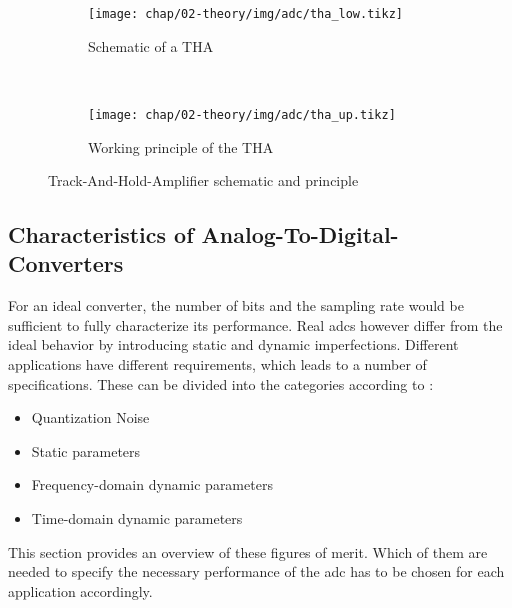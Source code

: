 \begin{figure}[tb]
	\centering
	\begin{subfigure}{\textwidth}
		\centering
		\texttt{[image: chap/02-theory/img/adc/tha\_low.tikz]}  
		\caption{Schematic of a THA}
		\label{fig:tha_low}
	\end{subfigure}
\\[4ex]
	\begin{subfigure}{\textwidth}
		\centering
		\texttt{[image: chap/02-theory/img/adc/tha\_up.tikz]}  
		\caption{Working principle of the THA}
		\label{fig:tha_up}
	\end{subfigure}
	\caption{Track-And-Hold-Amplifier schematic and principle \cite{walt}}
	\label{fig:tha_principle}
\end{figure}

\subsection{Characteristics of Analog-To-Digital-Converters}\label{ssec:adc_charac}
For an ideal converter, the number of bits and the sampling rate would be sufficient to fully characterize its performance.
Real \glspl{adc} however differ from the ideal behavior by introducing static and dynamic imperfections.
Different applications have different requirements, which leads to a number of specifications.
These can be divided into the categories according to \cite{Lundberg}:
\begin{itemize}[noitemsep]
	\item Quantization Noise
	\item Static parameters
	\item Frequency-domain dynamic parameters
	\item Time-domain dynamic parameters
\end{itemize} %
This section provides an overview of these figures of merit.
Which of them are needed to specify the necessary performance of the \gls{adc} has to be chosen for each application accordingly.

